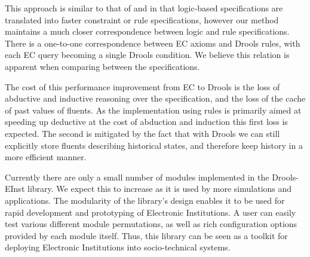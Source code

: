 This approach is similar to that of \citet{Arcos2005} and
\citet{Aldewereld2006} in that logic-based specifications are translated into
faster constraint or rule specifications, however our method maintains a much
closer correspondence between logic and rule specifications. There is a 
one-to-one correspondence between \ac{EC} axioms and Drools rules, with each
\ac{EC} query becoming a single Drools condition. We believe this relation is
apparent when comparing between the specifications.

The cost of this performance improvement from \ac{EC} to Drools is the loss of
abductive and inductive reasoning over the specification, and the loss of the
cache of past values of fluents. As the implementation using rules is
primarily aimed at speeding up deductive at the cost of abduction and
induction this first loss is expected. The second is mitigated by the fact
that with Drools we can still explicitly store fluents describing historical
states, and therefore keep history in a more efficient manner.

Currently there are only a small number of modules implemented in the 
Drools-EInst library. We expect this to increase as it is used by more simulations
and applications. The modularity of the library's design enables it to be used
for rapid development and prototyping of Electronic Institutions. A user can
easily test various different module permutations, as well as rich
configuration options provided by each module itself. Thus, this library can
be seen as a toolkit for deploying Electronic Institutions into socio-technical 
systems.






